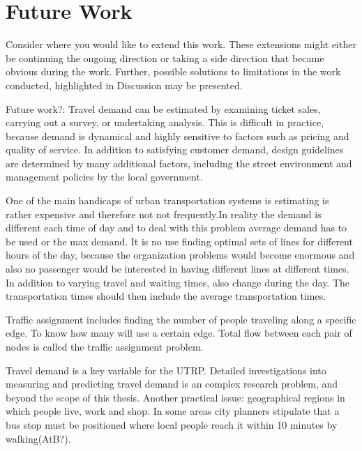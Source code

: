 \section{Future Work}

Consider where you would like to extend this work. These extensions might either be continuing the ongoing direction or taking a side direction that became obvious during the work. Further, possible solutions to limitations in the work conducted, highlighted in Discussion may be presented.

Future work?: Travel demand can be estimated by examining ticket sales, carrying out a survey, or undertaking analysis. This is difficult in practice, because demand is dynamical and highly sensitive to factors such as pricing and quality of service. In addition to satisfying customer demand, design guidelines are determined by many additional factors, including the street environment and management policies by the local government\citep{fan09}.

One of the main handicaps of urban transportation systems is estimating is rather expensive and therefore not not frequently.In reality the demand is different each time of day and to deal with this problem average demand has to be used or the max demand. It is no use finding optimal sets of lines for different hours of the day, because the organization problems would become enormous and also no passenger would be interested in having different lines at different times. In addition to varying travel and waiting times, also change during the day. The transportation times should then include the average transportation times. \citep{mandl79}

Traffic assignment includes finding the number of people traveling along a specific edge. 
To know how many will use a certain edge. Total flow between each pair of nodes is called the traffic assignment problem.

Travel demand is a key variable for the UTRP. Detailed investigations into measuring and predicting travel demand is an complex research problem, and beyond the scope of this thesis. Another practical issue: geographical regions in which people live, work and shop. In some areas city planners stipulate that a bus stop must be positioned where local people reach it within 10 minutes by walking(AtB?). 


